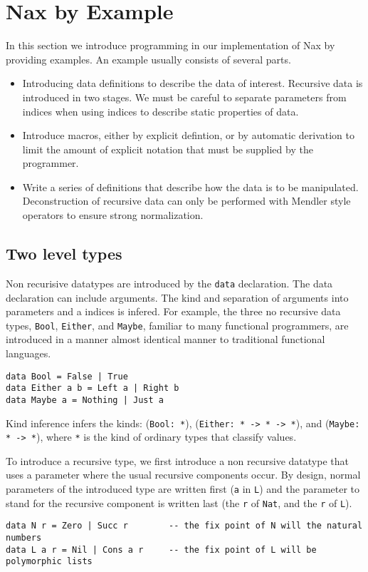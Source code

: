 
\section{Nax by Example}\label{sec:bg}

In this section we introduce programming in our implementation of Nax by providing
examples. An example usually consists of several parts.

\begin{itemize}
\item Introducing data definitions to describe the data of interest. Recursive
data is introduced in two stages. We must be careful to separate parameters
from indices when using indices to describe static properties of data.

\item Introduce macros, either by explicit defintion, or by automatic derivation
to limit the amount of explicit notation that must be supplied by the programmer.

\item Write a series of definitions that describe how the data is to be
manipulated. Deconstruction of recursive data can only be performed with Mendler style operators
to ensure strong normalization.

\end{itemize}

\subsection{Two level types}
Non recurisive datatypes are introduced by the \verb+data+ declaration.
The data declaration can include arguments. The kind and separation of
arguments into parameters and a indices is infered. For example, 
the three no recursive data types, \verb+Bool+, \verb+Either+, and 
\verb+Maybe+, familiar to many functional programmers, are introduced
in a manner almost identical manner to traditional functional languages.
{\small
\begin{verbatim}   
data Bool = False | True
data Either a b = Left a | Right b
data Maybe a = Nothing | Just a
\end{verbatim}}
Kind inference infers the kinds:
(\verb+Bool: *+), (\verb+Either: * -> * -> *+), and 
(\verb+Maybe: * -> *+), where \verb+*+ is the kind of ordinary types that
classify values.

To introduce a recursive type, we first introduce a non recursive datatype
that uses a parameter where the usual recursive components occur. By design,
normal parameters of the introduced type are written first (\verb+a+ in \verb+L+)
and the parameter to stand for the recursive component is written last
(the \verb+r+ of \verb+Nat+, and the \verb+r+ of \verb+L+).
{\small
\begin{verbatim}
data N r = Zero | Succ r        -- the fix point of N will the natural numbers
data L a r = Nil | Cons a r     -- the fix point of L will be polymorphic lists   
\end{verbatim}}

